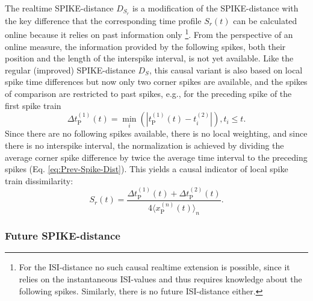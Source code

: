 \documentclass[10pt,twocolumn]{elsart5p}
\begin{document}
The realtime SPIKE-distance $D_{S_r}$ is a modification of the SPIKE-distance with the key difference that the corresponding time profile $S_r(t)$ can be calculated online because it relies on past information only \footnote{For the ISI-distance no such causal realtime extension is possible, since it relies on the instantaneous ISI-values and thus requires knowledge about the following spikes. Similarly, there is no future ISI-distance either.}. From the perspective of an online measure, the information provided by the following spikes, both their position and the length of the interspike interval, is not yet available. Like the regular (improved) SPIKE-distance $D_S$, this causal variant is also based on local spike time differences but now only two corner spikes are available, and the spikes of comparison are restricted to past spikes, e.g., for the preceding spike of the first spike train
%
\begin{equation} \label{eq:Delta-Corner-Spike-Realtime}
     \Delta t_{\mathrm {P}}^{(1)} (t) = \min_i (| t_{\mathrm {P}}^{(1)} (t) - t_i^{(2)} |), t_i \leq t.
\end{equation}
%
Since there are no following spikes available, there is no local weighting, and since there is no interspike interval, the normalization is achieved by dividing the average corner spike difference by twice the average time interval to the preceding spikes (Eq. \ref{eq:Prev-Spike-Dist}). This yields a causal indicator of local spike train dissimilarity:
%
\begin{equation} \label{eq:Bi-Spike-Diss-RT}
    S_r (t) = \frac{ \Delta t_{\mathrm {P}}^{(1)} (t) + \Delta t_{\mathrm {P}}^{(2)} (t)} {4 \langle x_{\mathrm {P}}^{(n)} (t) \rangle_n}.
\end{equation}


\subsubsection{\label{sss:Future-Spike-Distance} Future SPIKE-distance}
\end{document}
